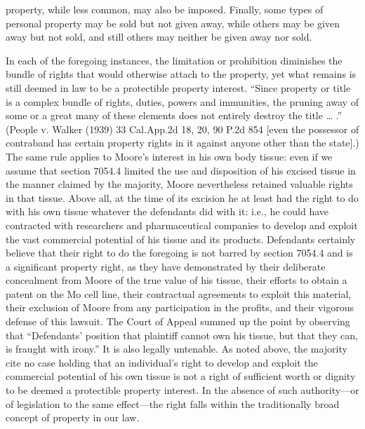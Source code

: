 property, while less common, may also be
imposed. Finally, some types of
personal property may be sold but not given
away, while others may be given away but not
sold, and still others may neither be given away nor
sold. 

In each of the foregoing instances, the limitation or prohibition diminishes the
bundle of rights that would otherwise attach to the property, yet what remains
is still deemed in law to be a protectible property interest. ``Since property
or title is a complex bundle of rights, duties, powers and immunities, the
pruning away of some or a great many of these elements does not entirely
destroy the title {\dots} .'' (People v. Walker (1939) 33 Cal.App.2d 18, 20, 90
P.2d 854 [even the possessor of contraband has certain property rights in it
against anyone other than the state].) The same rule applies to Moore's
interest in his own body tissue: even if we assume that section 7054.4 limited
the use and disposition of his excised tissue in the manner claimed by the
majority, Moore nevertheless retained valuable rights in that tissue. Above
all, at the time of its excision he at least had the right to do with his own
tissue whatever the defendants did with it: i.e., he could have contracted with
researchers and pharmaceutical companies to develop and exploit the vast
commercial potential of his tissue and its products. Defendants certainly
believe that their right to do the foregoing is not barred by section 7054.4
and is a significant property right, as they have demonstrated by their
deliberate concealment from Moore of the true value of his tissue, their
efforts to obtain a patent on the Mo cell line, their contractual agreements to
exploit this material, their exclusion of Moore from any participation in the
profits, and their vigorous defense of this lawsuit. The Court of Appeal summed
up the point by observing that ``Defendants' position that plaintiff cannot own
his tissue, but that they can, is fraught with irony.'' It is also legally
untenable. As noted above, the majority cite no case holding that an
individual's right to develop and exploit the commercial potential of his own
tissue is not a right of sufficient worth or dignity to be deemed a protectible
property interest. In the absence of such authority---or of legislation to the
same effect---the right falls within the traditionally broad concept of
property in our law.

